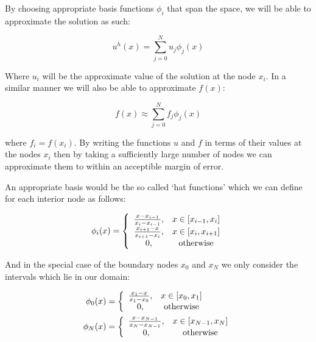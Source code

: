 By choosing appropriate basis functions $\phi_i$ that span the space, we will be able to approximate 
the solution as such:

\begin{equation}\label{eq:one-d-approx-soln}
	u^h(x) = \sum_{j = 0}^N{u_j\phi_j(x)}
\end{equation}

Where $u_i$ will be the approximate value of the solution at the node $x_i$. In a similar manner we will
also be able to approximate $f(x)$:

\begin{equation}
	f(x) \approx \sum_{j = 0}^N f_j\phi_j(x)
\end{equation}

where $f_i = f(x_i)$. By writing the functions $u$ and $f$ in terms of their values at the nodes $x_i$
then by taking a sufficiently large number of nodes we can approximate them to within an acceptible margin
of error.

An appropriate basis would be the so called `hat functions' which we can define for each interior node
as follows:

\begin{equation}\label{eq:one-d-hat-basis}
	\phi_i(x) = \left\{\begin{array}{c c}
    				\frac{x - x_{i-1}}{x_i - x_{i - 1}}, & x \in [x_{i-1}, x_i] \\
                    \frac{x_{i+1} - x}{x_{i + 1} - x_i}, & x \in [x_i, x_{i + 1}] \\
                    0, & \text{otherwise}
                \end{array}\right.
\end{equation}

And in the special case of the boundary nodes $x_0$ and $x_N$ we only consider the intervals which lie in our
domain:

\begin{align}
	\phi_0(x) &= \left\{\begin{array}{c c}
                    \frac{x_1 - x}{x_1 - x_0}, & x \in [x_0, x_1] \\
                    0, & \text{otherwise}
    \end{array}\right.
    \\
	\phi_N(x) &= \left\{\begin{array}{c c}
                    \frac{x - x_{N - 1}}{x_N - x_{N-1}}, & x \in [x_{N-1}, x_N] \\
                    0, & \text{otherwise}
    \end{array}\right.
\end{align}

